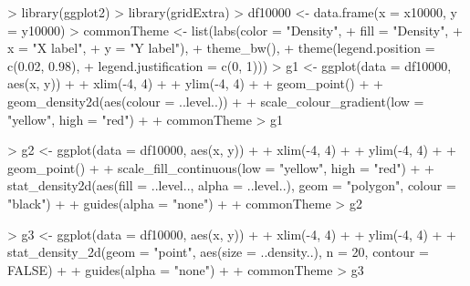 \documentclass[12pt,letterpaper,final]{article}
\begin{document}
\begin{Schunk}
\begin{Sinput}
> library(ggplot2)
> library(gridExtra)
> df10000 <- data.frame(x = x10000, y = y10000)
> commonTheme <- list(labs(color = "Density",
+                          fill = "Density",
+                          x = "X label",
+                          y = "Y label"),
+                     theme_bw(),
+                     theme(legend.position = c(0.02, 0.98),
+                           legend.justification = c(0, 1)))
> g1 <- ggplot(data = df10000, aes(x, y)) + 
+   xlim(-4, 4) +
+   ylim(-4, 4) +
+   geom_point() +
+   geom_density2d(aes(colour = ..level..)) + 
+   scale_colour_gradient(low = "yellow", high = "red") + 
+   commonTheme
> g1
\end{Sinput}
\end{Schunk}


\begin{Schunk}
\begin{Sinput}
> g2 <- ggplot(data = df10000, aes(x, y)) + 
+   xlim(-4, 4) +
+   ylim(-4, 4) +
+   geom_point() +
+   scale_fill_continuous(low = "yellow", high = "red") +
+   stat_density2d(aes(fill = ..level.., alpha = ..level..), geom = "polygon", colour = "black") + 
+   guides(alpha = "none") +
+   commonTheme
> g2
\end{Sinput}
\end{Schunk}


\begin{Schunk}
\begin{Sinput}
> g3 <- ggplot(data = df10000, aes(x, y)) + 
+   xlim(-4, 4) +
+   ylim(-4, 4) +
+   stat_density_2d(geom = "point", aes(size = ..density..), n = 20, contour = FALSE) + 
+   guides(alpha = "none") +
+   commonTheme
> g3
\end{Sinput}
\end{Schunk}
\end{document}
